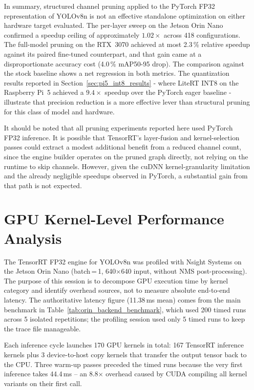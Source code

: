 \documentclass[12pt,a4paper]{report}
\begin{document}
In summary, structured channel pruning applied to the PyTorch FP32 representation of
YOLOv8n is not an effective standalone optimization on either hardware target evaluated.
The per-layer sweep on the Jetson Orin Nano confirmed a speedup ceiling of approximately
$1.02\times$ across 418 configurations. The full-model pruning on the RTX~3070 achieved
at most 2.3\,\% relative speedup against its paired fine-tuned counterpart, and that gain
came at a disproportionate accuracy cost (4.0\,\% mAP50-95 drop). The comparison against
the stock baseline shows a net regression in both metrics. The quantization results reported
in Section~\ref{sec:pi5_int8_results} - where LiteRT INT8 on the Raspberry Pi~5 achieved
a $9.4\times$ speedup over the PyTorch eager baseline - illustrate that precision reduction
is a more effective lever than structural pruning for this class of model and hardware.

It should be noted that all pruning experiments reported here used PyTorch FP32 inference.
It is possible that TensorRT's layer-fusion and kernel-selection passes could
extract a modest additional benefit from a reduced channel count, since the engine builder
operates on the pruned graph directly, not relying on the runtime to skip channels.
However, given the cuDNN kernel-granularity limitation and the already negligible
speedups observed in PyTorch, a substantial gain from that path is not expected.



\section{GPU Kernel-Level Performance Analysis}
\label{sec:gpu_kernel_analysis}

The TensorRT FP32 engine for YOLOv8n was profiled with Nsight Systems on the Jetson Orin Nano
(batch\,=\,1, 640$\times$640 input, without NMS post-processing).
The purpose of this session is to decompose GPU execution time by kernel category and identify
overhead sources, not to measure absolute end-to-end latency.
The authoritative latency figure (11.38\,ms mean) comes from the main benchmark in
Table~\ref{tab:orin_backend_benchmark}, which used 200 timed runs across 5 isolated repetitions;
the profiling session used only 5 timed runs to keep the trace file manageable.

Each inference cycle launches 170 GPU kernels in total: 167 TensorRT inference kernels plus 3
device-to-host copy kernels that transfer the output tensor back to the CPU.
Three warm-up passes preceded the timed runs because the very first inference takes 44.4\,ms --
an 8.8$\times$ overhead caused by CUDA compiling all kernel variants on their first call.
\end{document}

